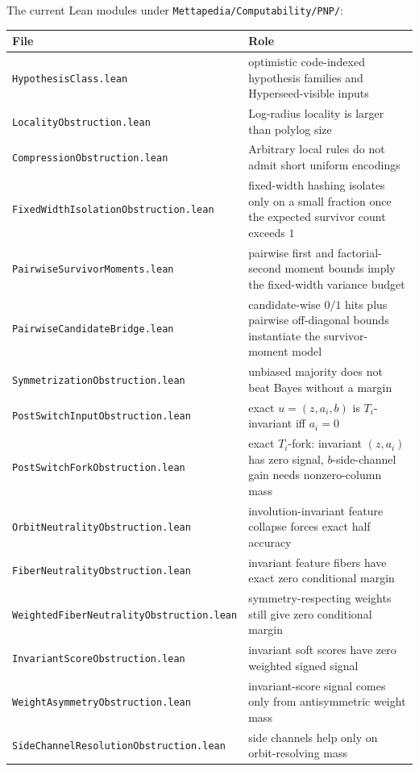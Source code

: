 \documentclass[11pt]{article}
\theoremstyle{remark}
\begin{document}
The current Lean modules under
\texttt{Mettapedia/Computability/PNP/}:
\begin{center}
\begin{tabular}{ll}
\toprule
\textbf{File} & \textbf{Role} \\
\midrule
\texttt{HypothesisClass.lean} & optimistic code-indexed hypothesis families and Hyperseed-visible inputs \\
\texttt{LocalityObstruction.lean} & Log-radius locality is larger than polylog size \\
\texttt{CompressionObstruction.lean} & Arbitrary local rules do not admit short uniform encodings \\
\texttt{FixedWidthIsolationObstruction.lean} & fixed-width hashing isolates only on a small fraction once the expected survivor count exceeds \(1\) \\
\texttt{PairwiseSurvivorMoments.lean} & pairwise first and factorial-second moment bounds imply the fixed-width variance budget \\
\texttt{PairwiseCandidateBridge.lean} & candidate-wise \(0/1\) hits plus pairwise off-diagonal bounds instantiate the survivor-moment model \\
\texttt{SymmetrizationObstruction.lean} & unbiased majority does not beat Bayes without a margin \\
\texttt{PostSwitchInputObstruction.lean} & exact \(u=(z,a_i,b)\) is \(T_i\)-invariant iff \(a_i=0\) \\
\texttt{PostSwitchForkObstruction.lean} & exact \(T_i\)-fork: invariant \((z,a_i)\) has zero signal, \(b\)-side-channel gain needs nonzero-column mass \\
\texttt{OrbitNeutralityObstruction.lean} & involution-invariant feature collapse forces exact half accuracy \\
\texttt{FiberNeutralityObstruction.lean} & invariant feature fibers have exact zero conditional margin \\
\texttt{WeightedFiberNeutralityObstruction.lean} & symmetry-respecting weights still give zero conditional margin \\
\texttt{InvariantScoreObstruction.lean} & invariant soft scores have zero weighted signed signal \\
\texttt{WeightAsymmetryObstruction.lean} & invariant-score signal comes only from antisymmetric weight mass \\
\texttt{SideChannelResolutionObstruction.lean} & side channels help only on orbit-resolving mass \\

\end{tabular}
\end{center}
\end{document}
